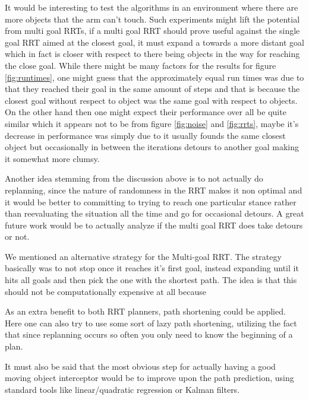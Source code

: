 \documentclass[letterpaper, 10 pt, conference]{ieeeconf}  %
\begin{document}
It would be interesting to test the algorithms in an environment where
there are more objects that the arm can't touch. Such experiments might
lift the potential from multi goal RRTs,  if a multi goal RRT should
prove useful against the single goal RRT aimed at the closest goal, it
must expand a towards a more distant goal which in fact is closer with
respect to there being objects in the way for reaching the close goal.
While there might be many factors for the results for figure
\ref{fig:runtimes}, one might guess that the approximately equal
run times was due to that they reached their goal in the same amount of
steps and that is because the closest goal without respect to object was
the same goal with respect to objects. On the other hand then one might
expect their performance over all be quite similar which it appears not
to be from figure \ref{fig:noise} and \ref{fig:rrts}, maybe it's
decrease in performance was simply due to it usually founds the same
closest object but occasionally in between the iterations detours to
another goal making it somewhat more clumsy.

Another idea stemming from the discussion above is to not actually do
replanning, since the nature of randomness in the RRT makes it non optimal
and it would be better to committing to trying to reach one particular
stance rather than reevaluating the situation all the time and go for
occasional detours. A great future work would be to actually analyze if
the multi goal RRT does take detours or not.

We mentioned an alternative strategy for the Multi-goal RRT.  The strategy
basically was to not stop once it reaches it's first goal, instead
expanding until it hits all goals and then pick the one with the
shortest path. The idea is that this should not be computationally
expensive at all because

As an extra benefit to both RRT planners, path shortening could be
applied. Here one can also try to use some sort of lazy path shortening,
utilizing the fact that since replanning occurs so often you only need
to know the beginning of a plan.

It must also be said that the most obvious step for actually
having a good moving object interceptor would be to improve upon the
path prediction, using standard tools like linear/quadratic regression
or Kalman filters.



\end{document}
